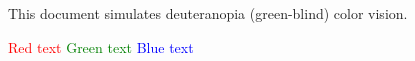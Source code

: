 \documentclass{article}
\begin{document}
This document simulates deuteranopia (green-blind) color vision.

\textcolor{red}{Red text} \textcolor{green}{Green text} \textcolor{blue}{Blue text}
\end{document}
